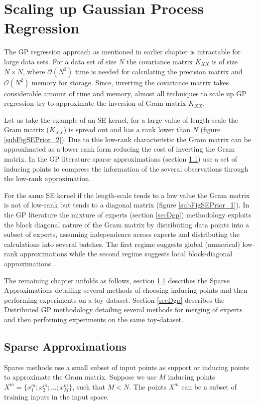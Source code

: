 \chapter{Scaling up Gaussian Process Regression}
\label{chapScalingGPR}

The GP regression approach as mentioned in earlier chapter is intractable for large data sets. For a data set of size $N$ the covariance matrix $K_{XX}$ is of size $N \times N$,  where $\mathcal{O}\left ( N^{3} \right )$ time is needed for calculating the precision matrix and $\mathcal{O}\left ( N^{2} \right )$ memory for storage. Since, inverting the covariance matrix takes considerable amount of time and memory, almost all techniques to scale up GP regression try to approximate the inversion of Gram matrix $K_{XX}$. 

Let us take the example of an SE kernel, for a large value of length-scale the Gram matrix ($K_{XX}$) is spread out and has a rank lower than  $N$ (figure \ref{subFigSEPrior_2}). Due to this low-rank characteristic the Gram matrix can be approximated as a lower rank form reducing the cost of inverting the Gram matrix. In the GP literature sparse approximations (section \ref{secSparseApprox}) use a set of inducing points to compress the information of the several observations through the low-rank approximation. 

For the same SE kernel if the length-scale tends to a low value the Gram matrix is not of low-rank but tends to a diagonal matrix (figure \ref{subFigSEPrior_1}). In the GP literature the mixture of experts (section \ref{secDgp}) methodology exploits the block diagonal nature of the Gram matrix by distributing data points into a subset of experts, assuming independence across experts and distributing the calculations into several batches. The first regime suggests global (numerical) low-rank approximations while the second regime suggests local block-diagonal approximations \cite{march2015askit, chenhan2016inv}. 

The remaining chapter unfolds as follows, section \ref{secSparseApprox} describes the Sparse Approximations detailing several methods of choosing inducing points and then performing experiments on a toy dataset. Section \ref{secDgp} describes the Distributed GP methodology detailing several methods for merging of experts and then performing experiments on the same toy-dataset. 

\section{Sparse Approximations}\label{secSparseApprox}
Sparse methods use a small subset of input points as support or inducing points to approximate the Gram matrix. Suppose we use $M$ inducing points $X^{m} = \{x^{m}_{1}; x^{m}_{2}; \ldots; x^{m}_{M}\}$, such that $M < N$. The points $X^{m}$ can be a subset of training inputs in the input space. 


